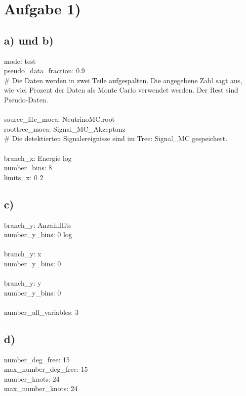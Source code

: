\section*{Aufgabe 1)}
\subsection*{a) und b)}
mode: test \\
pseudo\_data\_fraction: 0.9 \\
\# Die Daten werden in zwei Teile aufgespalten. Die angegebene Zahl sagt aus, wie viel Prozent der Daten als Monte Carlo verwendet werden. Der Rest sind Pseudo-Daten. \\
\\
source\_file\_moca: NeutrinoMC.root \\
roottree\_moca: Signal\_MC\_Akzeptanz \\
\# Die detektierten Signalereignisse sind im Tree: Signal\_MC gespeichert. \\
\\
branch\_x: Energie log \\
number\_bins: 8 \\
limits\_x: 0 2 \\



\subsection*{c)}
branch\_y: AnzahlHits \\
number\_y\_bins: 0 log \\
\\
branch\_y: x \\
number\_y\_bins: 0 \\
\\
branch\_y: y \\
number\_y\_bins: 0 \\
\\
number\_all\_variables: 3 \\



\subsection*{d)}
number\_deg\_free: 15 \\
max\_number\_deg\_free: 15 \\
number\_knots: 24 \\
max\_number\_knots: 24 \\

